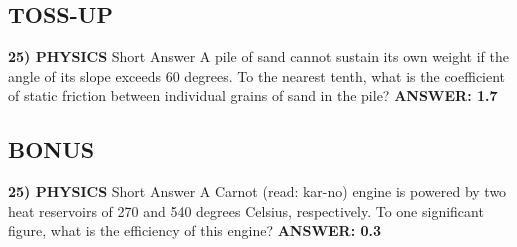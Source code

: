 \documentclass{article}
\begin{document}
\subsection*{TOSS-UP}
\textbf{25) PHYSICS}
Short Answer A pile of sand cannot sustain its own weight if the angle of its slope exceeds 60 degrees.
To the nearest tenth, what is the coefficient of static friction between individual grains of sand in the pile?
\textbf{ANSWER: 1.7}

\subsection*{BONUS}
\textbf{25) PHYSICS}
Short Answer A Carnot (read: kar-no) engine is powered by two heat reservoirs of 270 and 540 degrees Celsius, respectively.
To one significant figure, what is the efficiency of this engine?
\textbf{ANSWER: 0.3}
\end{document}
